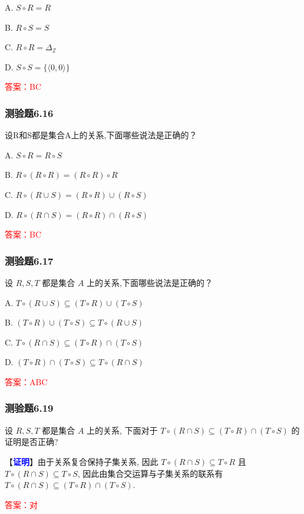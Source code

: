 \documentclass[UTF8, heading=true]{ctexart}
\begin{document}
A. $S \circ R=R$

B. $R \circ S=S$

C. $R \circ R=\Delta_{\mathbb{Z}}$

D. $S \circ S=\{\langle 0,0\rangle\}$

\textcolor{red}{答案：BC}

\subsubsection{测验题6.16}

设R和S都是集合A上的关系,下面哪些说法是正确的？

A. $S \circ R=R \circ S$

B. $R \circ(R \circ R)=(R \circ R) \circ R$

C. $R \circ(R \cup S)=(R \circ R) \cup(R \circ S)$

D. $R \circ(R \cap S)=(R \circ R) \cap(R \circ S)$

\textcolor{red}{答案：BC}



\subsubsection{测验题6.17}

设 $R, S, T$ 都是集合 $A$ 上的关系,下面哪些说法是正确的？

A. $T \circ (R \cup S) \subseteq (T \circ R) \cup (T \circ S)$

B. $ (T \circ R) \cup (T \circ S) \subseteq T \circ (R \cup S)$

C. $T \circ (R \cap S) \subseteq (T \circ R) \cap (T \circ S)$

D. $(T \circ R) \cap (T \circ S) \subseteq T \circ (R \cap S)$


\textcolor{red}{答案：ABC}

\subsubsection{测验题6.19}

设 $R, S, T$ 都是集合 $A$ 上的关系, 下面对于 $T \circ(R \cap S) \subseteq(T \circ R) \cap(T \circ S)$ 的证明是否正确?

【\textcolor{blue}{\textbf{证明}}】由于关系复合保持子集关系, 因此 $T \circ(R \cap S) \subseteq T \circ R$ 且 $T \circ(R \cap S) \subseteq T \circ S$, 因此由集合交运算与子集关系的联系有 $T \circ(R \cap S) \subseteq(T \circ R) \cap(T \circ S)$.

\textcolor{red}{答案：对}
\end{document}
